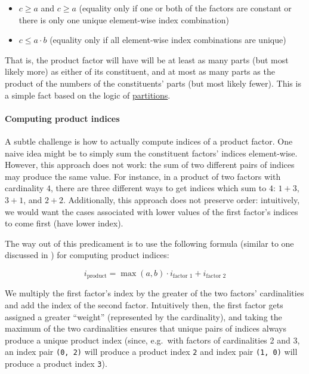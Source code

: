 \documentclass[
]{book}
\providecommand{\tightlist}{%
  \setlength{\itemsep}{0pt}\setlength{\parskip}{0pt}}
\theoremstyle{definition}
\theoremstyle{definition}
\theoremstyle{definition}
\theoremstyle{definition}
\theoremstyle{remark}
\begin{document}
\begin{itemize}
\tightlist
\item
  \(c \geq a\) and \(c \geq a\) (equality only if one or both of the factors are constant or there is only one unique element-wise index combination)
\item
  \(c \leq a \cdot b\) (equality only if all element-wise index combinations are unique)
\end{itemize}

That is, the product factor will have will be at least as many parts (but most likely more) as either of its constituent, and at most as many parts as the product of the numbers of the constituents' parts (but most likely fewer). This is a simple fact based on the logic of \hyperref[Partitions]{partitions}.

\paragraph{Computing product indices}\label{computing-product-indices}

A subtle challenge is how to actually compute indices of a product factor. One naive idea might be to simply sum the constituent factors' indices element-wise. However, this approach does not work: the sum of two different pairs of indices may produce the same value. For instance, in a product of two factors with cardinality \(4\), there are three different ways to get indices which sum to \(4\): \(1 + 3\), \(3 + 1\), and \(2 + 2\). Additionally, this approach does not preserve order: intuitively, we would want the cases associated with lower values of the first factor's indices to come first (have lower index).

The way out of this predicament is to use the following formula (similar to one discussed in ) for computing product indices:

\[i_{\text{product}} = \max(a, b) \cdot i_{\text{factor 1}} + i_{\text{factor 2}}\]

We multiply the first factor's index by the greater of the two factors' cardinalities and add the index of the second factor. Intuitively then, the first factor gets assigned a greater ``weight'' (represented by the cardinality), and taking the maximum of the two cardinalities ensures that unique pairs of indices always produce a unique product index (since, e.g.~with factors of cardinalities 2 and 3, an index pair \texttt{(0,\ 2)} will produce a product index \texttt{2} and index pair \texttt{(1,\ 0)} will produce a product index \texttt{3}).
\end{document}

